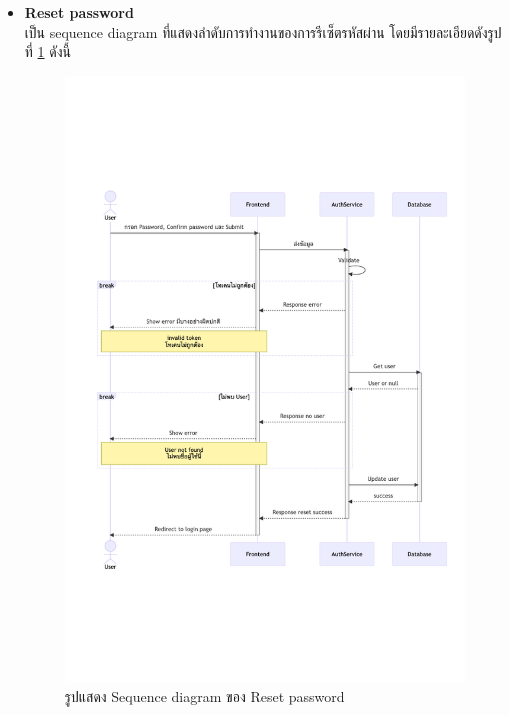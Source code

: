 \documentclass[12pt,oneside,openright,a4paper]{cpe-thai-project}
\begin{document}
\begin{itemize}
    
    \newpage
    \item \textbf{Reset password} \\
    เป็น sequence diagram ที่แสดงลำดับการทำงานของการรีเซ็ตรหัสผ่าน โดยมีรายละเอียดดังรูปที่ \ref{fig:sqResetPassword} ดังนี้
    \begin{figure}[!ht]\centering
        \includegraphics[width=15cm, trim={1cm 7cm 0.5cm 7cm},clip]{./assets/sequence-diagram/reset-password.png}
        \caption{รูปแสดง Sequence diagram ของ Reset password}\label{fig:sqResetPassword}
    \end{figure}


\end{itemize}
\end{document}

